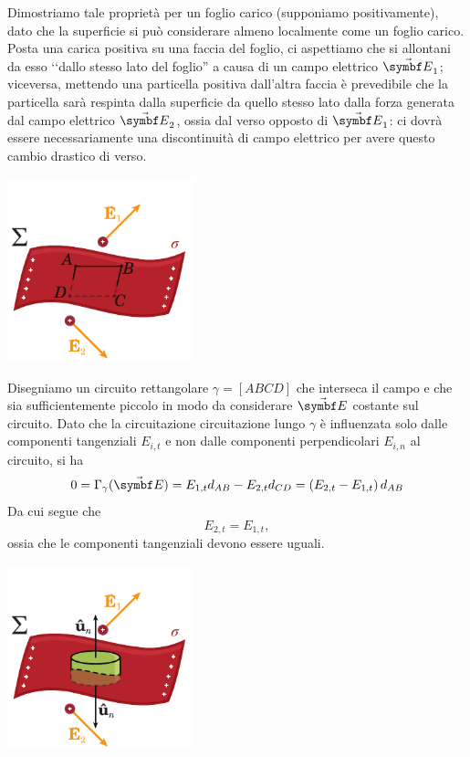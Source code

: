 \begin{demonstration}
	Dimostriamo tale proprietà per un foglio carico (supponiamo positivamente), dato che la superficie si può considerare almeno localmente come un foglio 
	carico.\\
	Posta una carica positiva su una faccia del foglio, ci aspettiamo che si allontani da esso ‘‘dallo stesso lato del foglio'' a causa di un campo elettrico $\vba{E}_1$; viceversa, mettendo una particella positiva dall'altra faccia è prevedibile che la particella sarà respinta dalla superficie da quello stesso lato dalla forza generata dal campo elettrico $\vba{E}_2$, ossia dal verso opposto di $\vba{E}_1$: ci dovrà essere necessariamente una discontinuità di campo elettrico per avere questo cambio drastico di verso.
	\begin{center}
		\includegraphics[width=0.4\textwidth]{images/chp3/chp3discontinuita1.pdf}
	\end{center}
	Disegniamo un circuito rettangolare $\gamma=[ABCD]$ che interseca il campo e che sia sufficientemente piccolo in modo da considerare $\vba{E}$ costante sul circuito. Dato che la circuitazione circuitazione lungo $\gamma$ è influenzata solo dalle componenti tangenziali $E_{i,t}$ e non dalle componenti perpendicolari $E_{i,n}$ al circuito, si ha
	\begin{equation*}
		0=\Gamma_{\gamma}(\vba{E})=E_{1,t}d_{AB}-E_{2,t}d_{CD}=\left(E_{2,t}-E_{1,t}\right)d_{AB}
	\end{equation*}
Da cui segue che
\begin{equation*}
	E_{2,t}=E_{1,t},
\end{equation*}
ossia che le componenti tangenziali devono essere uguali.
\begin{center}
	\includegraphics[width=0.4\textwidth]{images/chp3/chp3discontinuita2.pdf}

\end{center}
\end{demonstration}
